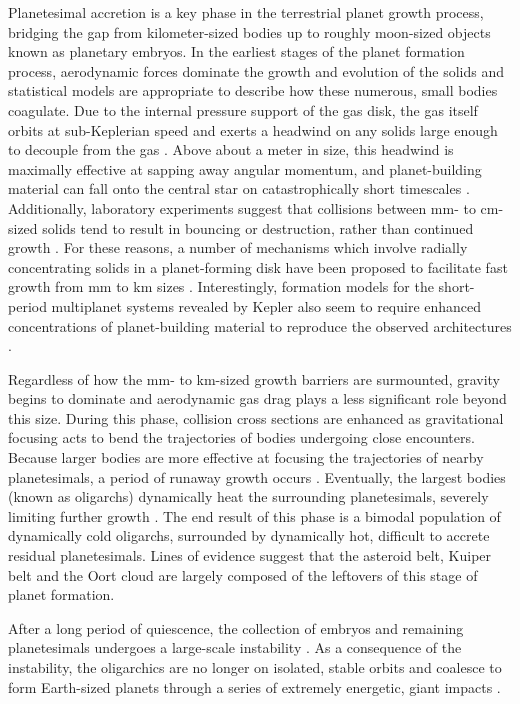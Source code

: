 \documentclass[twocolumn]{aastex63}
\begin{document}
Planetesimal accretion is a key phase in the terrestrial planet growth
process, bridging the gap from kilometer-sized bodies up to roughly
moon-sized objects known as planetary embryos. In the earliest stages
of the planet formation process, aerodynamic forces dominate the
growth and evolution of the solids and statistical models
\citep{johansen14, birnstiel16} are appropriate to describe how these
numerous, small bodies coagulate. Due to the internal pressure support
of the gas disk, the gas itself orbits at sub-Keplerian speed and
exerts a headwind on any solids large enough to decouple from the gas
\citep{weidenschilling77}. Above about a meter in size, this headwind
is maximally effective at sapping away angular momentum, and planet-building material can fall onto the central star on catastrophically short timescales \citep{weidenschilling77, nakagawa86}. Additionally, laboratory experiments suggest that collisions between mm- to cm- sized solids tend to result in bouncing or destruction, rather than continued growth \citep{blum93, beitz11, colwell03}. For these reasons, a number of mechanisms which involve radially concentrating solids in a planet-forming disk have been proposed to facilitate fast growth from mm to km sizes \citep{johansen07, lyra08, bai10}. Interestingly, formation models for the short-period multiplanet systems revealed by Kepler \citep{fabrycky14} also seem to require enhanced concentrations of planet-building material to reproduce the observed architectures \citep{raymond07, hansen12}.

Regardless of how the mm- to km-sized growth barriers are surmounted, gravity begins to dominate and aerodynamic gas drag plays a less significant role beyond this size. During this phase, collision cross sections are enhanced as gravitational focusing \citep{safronov69} acts to bend the trajectories of bodies undergoing close encounters. Because larger bodies are more effective at focusing the trajectories of nearby planetesimals, a period of runaway growth occurs \citep{wetherill89, kokubo96, barnes09}. Eventually, the largest bodies (known as oligarchs) dynamically heat the surrounding planetesimals, severely limiting further growth \citep{kokubo98}. The end result of this phase is a bimodal population of dynamically cold oligarchs, surrounded by dynamically hot, difficult to accrete residual planetesimals. Lines of evidence suggest that the asteroid belt, Kuiper belt and the Oort cloud are largely composed of the leftovers of this stage of planet formation.

After a long period of quiescence, the collection of embryos and
remaining planetesimals undergoes a large-scale instability
\citep{chambers98}.
As a consequence of the instability, the oligarchics are no longer
on isolated, stable orbits and coalesce to form Earth-sized planets
through a series of extremely energetic, giant 
impacts \citep{kokubo02, raymond05, raymond06}.
\end{document}
